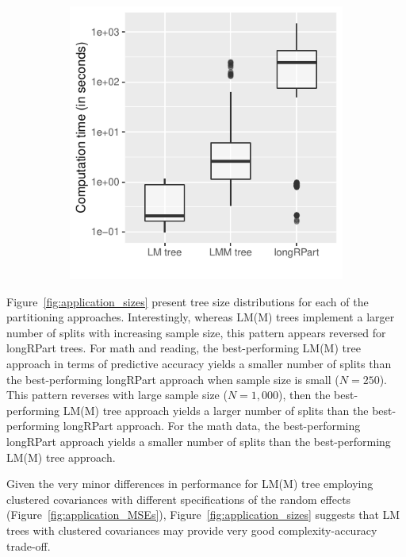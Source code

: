 \documentclass[doc,floatsintext,natbib]{apa7}
\begin{document}
\begin{figure}[h]
\caption{Computation times for partitioning math, reading and science ability trajectories.}
\begin{subfigure}{.5\textwidth}
\includegraphics{_Partitioning_GCMs_with_GLMM_trees-031}
\end{subfigure}
\label{fig:application_times}
\end{figure}

Figure~\ref{fig:application_sizes} present tree size distributions for each of the partitioning approaches. Interestingly, whereas LM(M) trees implement a larger number of splits with increasing sample size, this pattern appears reversed for longRPart trees. For math and reading, the best-performing LM(M) tree approach in terms of predictive accuracy yields a smaller number of splits than the best-performing longRPart approach when sample size is small ($N=250$). This pattern reverses with large sample size ($N=1,000$), then the best-performing LM(M) tree approach yields a larger number of splits than the best-performing longRPart approach. For the math data, the best-performing longRPart approach yields a smaller number of splits than the best-performing LM(M) tree approach. 

Given the very minor differences in performance for LM(M) tree employing clustered covariances with different specifications of the random effects (Figure~\ref{fig:application_MSEs}), Figure~\ref{fig:application_sizes} suggests that LM trees with clustered covariances may provide very good complexity-accuracy trade-off.    
\end{document}
